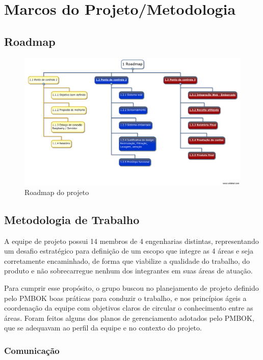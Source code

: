 \clearpage

\section{Marcos do Projeto/Metodologia}

\subsection{Roadmap}

\begin{figure}[h]
    \centering
    \includegraphics[scale=0.4]{images/pi2-roadmap.png}
    \caption{Roadmap do projeto}
\end{figure}


\subsection{Metodologia de Trabalho}
A equipe de projeto possui 14 membros de 4 engenharias distintas, representando um desafio estratégico para definição de um escopo que integre as 4 áreas e seja corretamente encaminhado, de forma que viabilize a qualidade do trabalho, do produto e não sobrecarregue nenhum dos integrantes em suas áreas de atuação.

Para cumprir esse propósito, o grupo buscou no planejamento de projeto definido pelo PMBOK boas práticas para conduzir o trabalho, e nos princípios ágeis a coordenação da equipe com objetivos claros de circular o conhecimento entre as áreas. Foram feitos alguns dos planos de gerenciamento adotados pelo PMBOK, que se adequavam ao perfil da equipe e no contexto do projeto.

\subsubsection{Comunicação}

